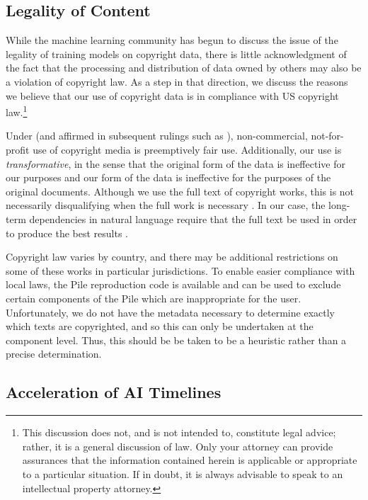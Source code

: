 \documentclass[11pt,a4paper]{article}
\begin{document}
\subsection{Legality of Content}\label{subsec:law}

While the machine learning community has begun to discuss the issue of the legality of training models on copyright data, there is little acknowledgment of the fact that the processing and distribution of data owned by others may also be a violation of copyright law. As a step in that direction, we discuss the reasons we believe that our use of copyright data is in compliance with US copyright law.\footnote{This discussion does not, and is not intended to, constitute legal advice; rather, it is a general discussion of law. Only your attorney can provide assurances that the information contained herein is applicable or appropriate to a particular situation. If in doubt, it is always advisable to speak to an intellectual property attorney.}

Under \citet{presumptive-fair-use} (and affirmed in subsequent rulings such as \citet{affirm-presumption,guild-v-google}), non-commercial, not-for-profit use of copyright media is preemptively fair use. Additionally, our use is \textit{transformative}, in the sense that the original form of the data is ineffective for our purposes and our form of the data is ineffective for the purposes of the original documents. Although we use the full text of copyright works, this is not necessarily disqualifying when the full work is necessary \citep{full-work}. In our case, the long-term dependencies in natural language require that the full text be used in order to produce the best results \citep{transformer-xl,PG19,scaling-autoregressive,liu2018generating}.

Copyright law varies by country, and there may be additional restrictions on some of these works in particular jurisdictions. To enable easier compliance with local laws, the Pile reproduction code is available and can be used to exclude certain components of the Pile which are inappropriate for the user. Unfortunately, we do not have the metadata necessary to determine exactly which texts are copyrighted, and so this can only be undertaken at the component level. Thus, this should be be taken to be a heuristic rather than a precise determination.

\subsection{Acceleration of AI Timelines}
\end{document}
